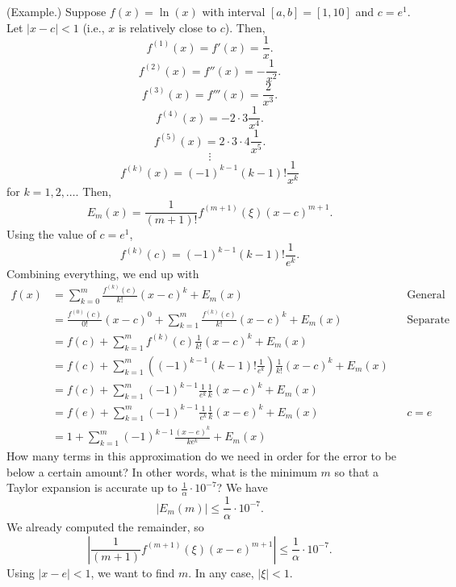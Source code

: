 \documentclass[letterpaper]{article}
\begin{document}
\begin{mdframed}
    (Example.) Suppose $f(x) = \ln(x)$ with interval $[a, b] = [1, 10]$ and $c = e^1.$ Let $|x - c| < 1$ (i.e., $x$ is relatively close to $c$). Then, 
    \[f^{(1)}(x) = f'(x) = \frac{1}{x}.\]
    \[f^{(2)}(x) = f''(x) = -\frac{1}{x^2}.\]
    \[f^{(3)}(x) = f'''(x) = \frac{2}{x^3}.\]
    \[f^{(4)}(x) = -2 \cdot 3 \frac{1}{x^4}.\]
    \[f^{(5)}(x) = 2 \cdot 3 \cdot 4 \frac{1}{x^5}.\]
    \[\vdots\]
    \[f^{(k)}(x) = (-1)^{k - 1} (k - 1)! \frac{1}{x^k}\]
    for $k = 1, 2, \hdots$. Then, 
    \[E_m (x) = \frac{1}{(m + 1)!} f^{(m + 1)}(\xi) (x - c)^{m + 1}.\] Using the value of $c = e^1$, \[f^{(k)}(c) = (-1)^{k - 1}(k - 1)! \frac{1}{e^k}.\] Combining everything, we end up with 
    \begin{equation*}
        \begin{aligned}
            f(x) &= \sum_{k = 0}^{m} \frac{f^{(k)} (c)}{k!} (x - c)^k + E_{m}(x) && \text{General Taylor Series} \\ 
                &= \frac{f^{(0)}(c)}{0!} (x - c)^0 + \sum_{k = 1}^{m} \frac{f^{(k)}(c)}{k!} (x - c)^k + E_{m}(x) && \text{Separate the first term in summation} \\ 
                &= f(c) + \sum_{k = 1}^{m} f^{(k)}(c) \frac{1}{k!} (x - c)^k + E_{m}(x) \\ 
                &= f(c) + \sum_{k = 1}^{m} \left((-1)^{k - 1}(k - 1)! \frac{1}{e^k}\right) \frac{1}{k!} (x - c)^k + E_{m}(x) \\ 
                &= f(c) + \sum_{k = 1}^{m} (-1)^{k - 1} \frac{1}{e^k} \frac{1}{k} (x - c)^k + E_{m}(x) \\ 
                &= f(e) + \sum_{k = 1}^{m} (-1)^{k - 1} \frac{1}{e^k} \frac{1}{k} (x - e)^k + E_{m}(x) && c = e \\ 
                &= 1 + \sum_{k = 1}^{m} (-1)^{k - 1} \frac{(x - e)^k }{k e^k} + E_{m}(x) 
        \end{aligned}
    \end{equation*}
    How many terms in this approximation do we need in order for the error to be below a certain amount? In other words, what is the minimum $m$ so that a Taylor expansion is accurate up to $\frac{1}{\alpha} \cdot 10^{-7}$? We have 
    \[|E_m (m)| \leq \frac{1}{\alpha} \cdot 10^{-7}.\]
    We already computed the remainder, so 
    \[\left| \frac{1}{(m + 1)} f^{(m + 1)} (\xi) (x - e)^{m + 1}\right| \leq \frac{1}{\alpha} \cdot 10^{-7}.\] Using $|x - e| < 1$, we want to find $m$. In any case, $|\xi| < 1$. 
\end{mdframed}
\end{document}
